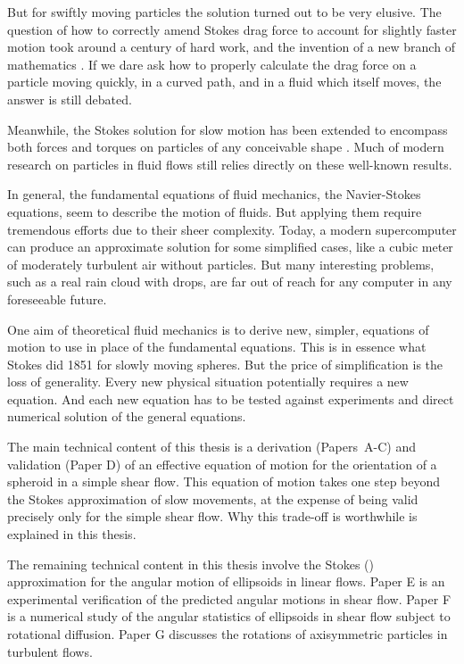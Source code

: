 \documentclass[thesis.tex]{subfiles}
\begin{document}
But for swiftly moving particles
the solution turned out to be very elusive. The question of how to correctly amend Stokes drag force to account for slightly faster motion took around a century of hard work, and the invention of a new branch of mathematics \cite{veysey2007}. If we dare ask how to properly calculate the drag force on a particle moving quickly, in a curved path, and in a fluid which itself moves, the answer is still debated.

Meanwhile, the Stokes solution for slow motion has been extended to encompass both forces and torques on particles of any conceivable shape \cite{jeffery1922,brenner1974,kim1991}. Much of modern research on particles in fluid flows still relies directly on these well-known results.

In general, the fundamental equations of fluid mechanics, the Navier-Stokes equations, seem to describe the motion of fluids. But applying them require tremendous efforts due to their sheer complexity. Today, a modern supercomputer can produce an approximate solution for some simplified cases, like a cubic meter of moderately turbulent air without particles. But many interesting problems, such as a real rain cloud with drops, are far out of reach for any computer in any foreseeable future.

One aim of theoretical fluid mechanics is to derive new, simpler, equations of motion to use in place of the fundamental equations. This is in essence what Stokes did 1851 for slowly moving spheres. But the price of simplification is the loss of generality. Every new physical situation potentially requires a new equation. And each new equation has to be tested against experiments and direct numerical solution of the general equations.

The main technical content of this thesis is a derivation (Papers~A-C) and validation (Paper D) of an effective equation of motion for the orientation of a spheroid in a simple shear flow. This equation of motion takes one step beyond the Stokes approximation of slow movements, at the expense of being valid precisely only for the simple shear flow. Why this trade-off is worthwhile is explained in this thesis.

The remaining technical content in this thesis involve the Stokes (\citet{jeffery1922}) approximation for the angular motion of ellipsoids in linear flows. Paper E is an experimental verification of the predicted angular motions in shear flow. Paper F is a numerical study of the angular statistics of ellipsoids in shear flow subject to rotational diffusion. Paper G discusses the rotations of axisymmetric particles in turbulent flows.
\end{document}
